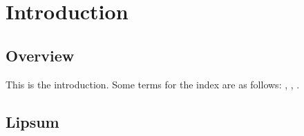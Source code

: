 \chapter{Introduction}

\section{Overview}

This is the introduction.
Some terms for the index are as follows:
, , .

\section{Lipsum}

\lipsum
\lipsum
\lipsum
\lipsum
